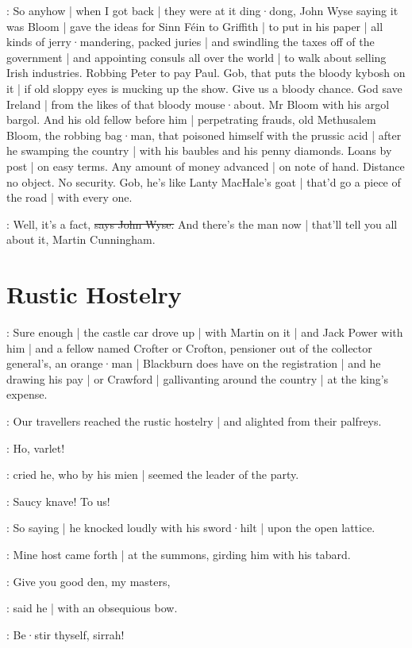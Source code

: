 \Nq:
So anyhow |
when I got back |
they were at it ding·dong,
John Wyse saying it was Bloom |
gave the ideas for Sinn Féin to Griffith |
to put in his paper |
all kinds of jerry·mandering,
packed juries |
and swindling the taxes off of the government |
and appointing consuls all over the world |
to walk about selling Irish industries.
Robbing Peter to pay Paul.
Gob,
that puts the bloody kybosh on it |
if old sloppy eyes is mucking up the show.
Give us a bloody chance.
God save Ireland |
from the likes of that bloody mouse·about.
Mr Bloom with his argol bargol.
And his old fellow before him |
perpetrating frauds,
old Methusalem Bloom,
the robbing bag·man,
that poisoned himself with the prussic acid |
after he swamping the country |
with his baubles and his penny diamonds.
Loans by post |
on easy terms.
Any amount of money advanced |
on note of hand.
Distance no object.
No security.
Gob,
he's like Lanty MacHale's goat |
that'd go a piece of the road |
with every one.

\johnwyse:
Well,
it's a fact,
\sout{says John Wyse.}
And there's the man now |
that'll tell you all about it,
Martin Cunningham.


\section{Rustic Hostelry}

\Nq:
Sure enough |
the castle car drove up |
with Martin on it |
and Jack Power with him |
and a fellow named Crofter or Crofton,
pensioner out of the collector general's,
an orange·man |
Blackburn does have on the registration |
and he drawing his pay |
or Crawford |
gallivanting around the country |
at the king's expense.


:
Our travellers reached the rustic hostelry |
and alighted from their palfreys.

\cunningham:
Ho,
varlet!

:
cried he,
who by his mien |
seemed the leader of the party.

\cunningham:
Saucy knave!
To us!

:
So saying |
he knocked loudly with his sword·hilt |
upon the open lattice.

:
Mine host came forth |
at the summons,
girding him with his tabard.

\terry:
Give you good den,
my masters,

:
said he |
with an obsequious bow.

\cunningham:
Be·stir thyself,
sirrah!


